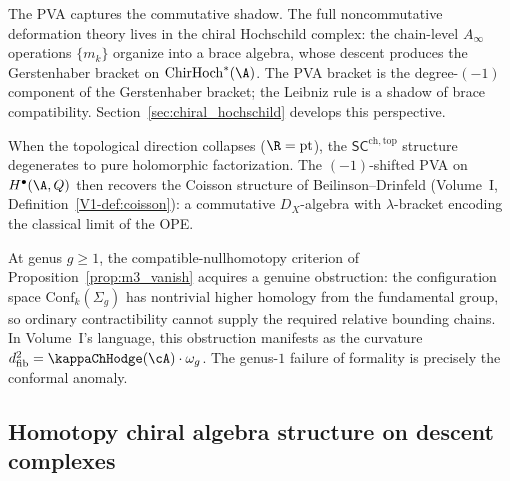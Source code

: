 \begin{remark}
The PVA captures the commutative shadow. The full
noncommutative deformation theory lives in the chiral Hochschild
complex: the chain-level $A_\infty$ operations $\{m_k\}$ organize
into a brace algebra, whose descent produces the Gerstenhaber
bracket on $\mathrm{ChirHoch}^\ast(\A)$. The PVA bracket is the
degree-$(-1)$ component of the Gerstenhaber bracket; the Leibniz
rule is a shadow of brace compatibility.
Section~\ref{sec:chiral_hochschild} develops this perspective.
\end{remark}

\begin{remark}
When the topological direction collapses ($\R = \mathrm{pt}$), the
$\mathsf{SC}^{\mathrm{ch,top}}$ structure degenerates to pure
holomorphic factorization. The $(-1)$-shifted PVA on
$H^\bullet(\A, Q)$ then recovers the Coisson structure of
Beilinson--Drinfeld (Volume~I, Definition~\ref{V1-def:coisson}): a
commutative $D_X$-algebra with $\lambda$-bracket encoding the
classical limit of the OPE.
\end{remark}

\begin{remark}
At genus $g \geq 1$, the compatible-nullhomotopy criterion of
Proposition~\ref{prop:m3_vanish} acquires a genuine obstruction:
the configuration space $\mathrm{Conf}_k(\Sigma_g)$ has nontrivial
higher homology from the fundamental group, so ordinary
contractibility cannot supply the required relative bounding chains.
In Volume~I's language, this obstruction manifests as the curvature
$d_{\mathrm{fib}}^2 = \kappaChHodge(\cA) \cdot \omega_g$. The genus-$1$
failure of formality is precisely the conformal anomaly.
\end{remark}


\subsection{Homotopy chiral algebra structure on descent complexes}

